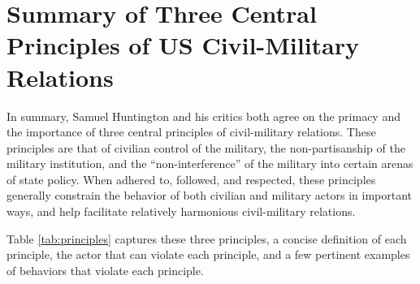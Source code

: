\documentclass[
  12pt,
  oneside]{memoir}
\begin{document}
\hypertarget{summary-of-three-central-principles-of-us-civil-military-relations}{%
\section{Summary of Three Central Principles of US Civil-Military Relations}\label{summary-of-three-central-principles-of-us-civil-military-relations}}

In summary, Samuel Huntington and his critics both agree on the primacy and the importance of three central principles of civil-military relations. These principles are that of civilian control of the military, the non-partisanship of the military institution, and the ``non-interference'' of the military into certain arenas of state policy. When adhered to, followed, and respected, these principles generally constrain the behavior of both civilian and military actors in important ways, and help facilitate relatively harmonious civil-military relations.

Table \ref{tab:principles} captures these three principles, a concise definition of each principle, the actor that can violate each principle, and a few pertinent examples of behaviors that violate each principle.
\end{document}
